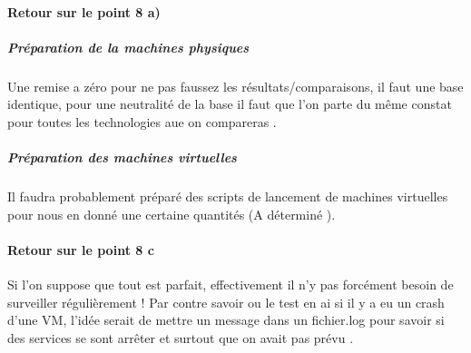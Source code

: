 \documentclass[french]{article}
\begin{document}
\newpage
\paragraph{Retour sur le point 8 a) }
\subparagraph{Préparation de la machines physiques }
Une remise a zéro pour ne pas faussez les résultats/comparaisons, il faut une base identique, pour une neutralité de la base il faut que l'on parte du même constat pour toutes les technologies aue on compareras . 
\subparagraph{Préparation des machines virtuelles }
Il faudra probablement préparé des scripts de lancement de machines virtuelles pour nous en donné une certaine quantités (A déterminé ).
\paragraph{Retour sur le point 8 c }
Si l'on suppose que tout est parfait, effectivement il n'y pas forcément besoin de surveiller régulièrement ! 
Par contre savoir ou le test en ai si il y a eu un crash d'une VM, l'idée serait de mettre un message dans un fichier.log pour savoir si des services se sont arrêter et surtout que on avait pas prévu . 
\end{document}
